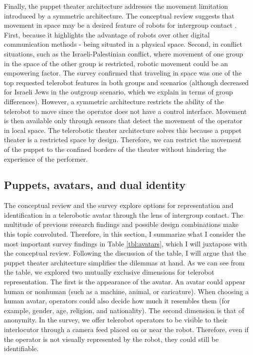 \documentclass[dissertation,math,vertlayout,pdfa,colorlinks,nologo]{aaltoseries}
\begin{document}
Finally, the puppet theater architecture addresses the movement limitation introduced by a symmetric architecture. The conceptual review suggests that movement in space may be a desired feature of robots for intergroup contact \cite[p. 84]{peledTelerobotContactHypothesis2022}. First, because it highlights the advantage of robots over other digital communication methods - being situated in a physical space. Second, in conflict situations, such as the Israeli-Palestinian conflict, where movement of one group in the space of the other group is restricted, robotic movement could be an empowering factor. The survey confirmed that traveling in space was one of the top requested telerobot features in both groups and scenarios (although decreased for Israeli Jews in the outgroup scenario, which we explain in terms of group differences). However, a symmetric architecture restricts the ability of the telerobot to move since the operator does not have a control interface. Movement is then available only through sensors that detect the movement of the operator in local space. The telerobotic theater architecture solves this because a puppet theater is a restricted space by design. Therefore, we can restrict the movement of the puppet to the confined borders of the theater without hindering the experience of the performer.

\subsection{Puppets, avatars, and dual identity}
The conceptual review and the survey explore options for representation and identification in a telerobotic avatar through the lens of intergroup contact. The multitude of previous research findings and possible design combinations make this topic convoluted. Therefore, in this section, I summarize what I consider the most important survey findings in Table \ref{tbl:avatars}, which I will juxtapose with the conceptual review. Following the discussion of the table, I will argue that the puppet theater architecture simplifies the dilemmas at hand. As we can see from the table, we explored two mutually exclusive dimensions for telerobot representation. The first is the appearance of the avatar. An avatar could appear human or nonhuman (such as a machine, animal, or caricature). When choosing a human avatar, operators could also decide how much it resembles them (for example, gender, age, religion, and nationality). The second dimension is that of anonymity. In the survey, we offer telerobot operators to be visible to their interlocutor through a camera feed placed on or near the robot. Therefore, even if the operator is not visually represented by the robot, they could still be identifiable.
\end{document}
